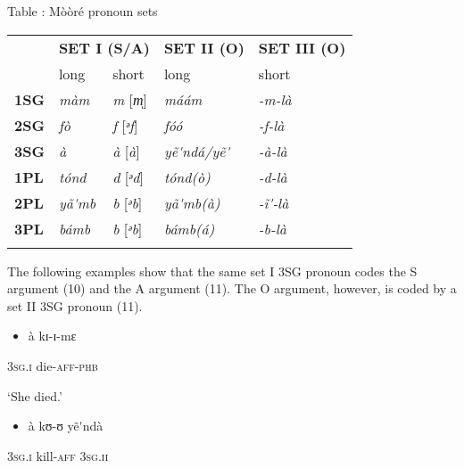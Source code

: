 \documentclass[output=paper]{langsci/langscibook}
\begin{document}
{\begin{styleTabellenberschrift}
\label{bkm:Ref424142670}Table : M\`{o}\`{o}r\'{e} pronoun sets
\end{styleTabellenberschrift}

\begin{tabular}{lllll}
\lsptoprule
\hhline{~----} & \multicolumn{2}{l}{ \textbf{SET I (S/A)}} & \textbf{SET II (O)} & \textbf{SET III (O)}\\
& long & short & long & short\\
\textbf{1SG} & \textit{m\`{a}m} & \textit{m   }[\textit{m̩}] & \textit{m\'{a}\'{a}m} & \textit{{}-m-l\`{a}}\\
\textbf{2SG} & \textit{f\`{o}} & \textit{f     }[\textit{ᵊf}] & \textit{f\'{o}\'{o}} & \textit{{}-f-l\`{a}}\\
\textbf{3SG} & \textit{\`{a}} & \textit{à    }[\textit{\`{a}}] & \textit{y\~{e}\'{ }nd\'{a}/y\~{e}\'{ }} & \textit{{}-\`{a}-l\`{a}}\\
\textbf{1PL} & \textit{t\'{o}nd} & \textit{d}    [\textit{ᵊd}] & \textit{t\'{o}nd(\`{o})} & \textit{{}-d-l\`{a}}\\
\textbf{2PL} & \textit{y\~{a}\'{ }mb} & \textit{b    }[\textit{ᵊb}] & \textit{y\~{a}\'{ }mb(\`{a})} & \textit{{}-\~{i}\'{ }-l\`{a}}\\
\textbf{3PL} & \textit{b\'{a}mb} & \textit{b    }[\textit{ᵊb}] & \textit{b\'{a}mb(\'{a})} & \textit{{}-b-l\`{a}}\\
\lspbottomrule
\end{tabular}
The following examples show that the same set I 3SG pronoun codes the S argument (10) and the A argument (11). The O argument, however, is coded by a set II 3SG pronoun (11).

\begin{itemize}
\item \begin{styleNumberedEX}
\label{bkm:Ref424141576}\`{a}    kɪ-ɪ{}-mɛ          
\end{styleNumberedEX}\end{itemize}
\begin{styleGloss}
\textsc{3sg.i    }die-\textsc{aff-phb}
\end{styleGloss}

\begin{styleTranslation}
‘She died.’
\end{styleTranslation}

\begin{itemize}
\item \begin{styleNumberedEX}
\label{bkm:Ref424141584}\`{a}    kʊ-ʊ    y\~{e}\'{ }nd\`{a}
\end{styleNumberedEX}\end{itemize}
\begin{styleGloss}
\textsc{3sg.i}    kill-\textsc{aff  3sg.ii}
\end{styleGloss}

}
\end{document}
